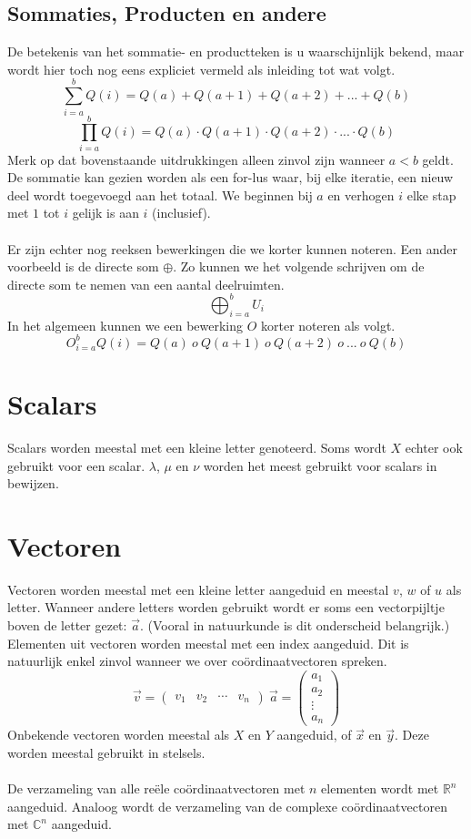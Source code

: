 \documentclass[lineaire_algebra_oplossingen.tex]{subfiles}
\begin{document}
\subsection{Sommaties, Producten en andere}
De betekenis van het sommatie- en productteken is u waarschijnlijk bekend, maar wordt hier toch nog eens expliciet vermeld als inleiding tot wat volgt. 
\[
\sum_{i=a}^bQ(i) = Q(a) + Q(a+1)+ Q(a+2) + ... + Q(b) 
\]
\[
\prod_{i=a}^bQ(i) = Q(a) \cdot Q(a+1)\cdot Q(a+2) \cdot ... \cdot Q(b) 
\]
Merk op dat bovenstaande uitdrukkingen alleen zinvol zijn wanneer $a < b$ geldt.
De sommatie kan gezien worden als een for-lus waar, bij elke iteratie, een nieuw deel wordt toegevoegd aan het totaal.
We beginnen bij $a$ en verhogen $i$ elke stap met $1$ tot $i$ gelijk is aan $i$ (inclusief).\\\\
Er zijn echter nog reeksen bewerkingen die we korter kunnen noteren. 
Een ander voorbeeld is de directe som $\oplus$. Zo kunnen we het volgende schrijven om de directe som te nemen van een aantal deelruimten.
\[
\bigoplus_{i=a}^bU_i
\]
In het algemeen kunnen we een bewerking $O$ korter noteren als volgt.
\[
O_{i=a}^bQ(i) = Q(a)\ o\ Q(a+1)\ o\ Q(a+2)\ o\ ...\ o\ Q(b) 
\]

\section{Scalars}
Scalars worden meestal met een kleine letter genoteerd. Soms wordt $X$ echter ook gebruikt voor een scalar. $\lambda$, $\mu$ en $\nu$ worden het meest gebruikt voor scalars in bewijzen.

\section{Vectoren}
Vectoren worden meestal met een kleine letter aangeduid en meestal $v$, $w$ of $u$ als letter.
Wanneer andere letters worden gebruikt wordt er soms een vectorpijltje boven de letter gezet: $\vec{a}$. (Vooral in natuurkunde is dit onderscheid belangrijk.)
Elementen uit vectoren worden meestal met een index aangeduid. Dit is natuurlijk enkel zinvol wanneer we over co\"ordinaatvectoren spreken.
\[
\vec{v} = 
\begin{pmatrix}
v_{1}&v_{2}&\cdots&v_{n}
\end{pmatrix}
\ 
\vec{a} = 
\begin{pmatrix}
a_{1}\\a_{2}\\\vdots\\a_{n}
\end{pmatrix}
\]
Onbekende vectoren worden meestal als $X$ en $Y$ aangeduid, of $\vec{x}$ en $\vec{y}$. Deze worden meestal gebruikt in stelsels.\\\\
De verzameling van alle re\"ele co\"ordinaatvectoren met $n$ elementen wordt met $\mathbb{R}^n$ aangeduid. Analoog wordt de verzameling van de complexe co\"ordinaatvectoren met $\mathbb{C}^n$ aangeduid.
\end{document}
